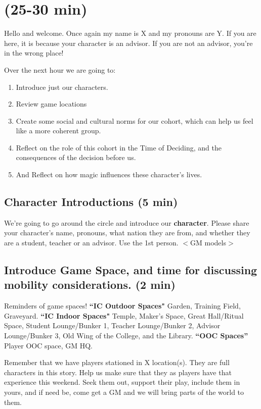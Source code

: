 \documentclass[green]{GL2020}
\begin{document}
\name{\gPreGameAdvisor{}}

\section*{(25-30 min)}

Hello and welcome. Once again my name is X and my pronouns are Y. If you are here, it is because your character is an advisor. If you are not an advisor, you're in the wrong place!

Over the next hour we are going to:
\begin{enumerate}
	\item Introduce just our characters.
	\item Review game locations
	\item Create some social and cultural norms for our cohort, which can help us feel like a more coherent group.
	\item Reflect on the role of this cohort in the Time of Deciding, and the consequences of the decision before us.
	\item And Reflect on how magic influences these character’s lives.
\end{enumerate}

\subsection*{Character Introductions (5 min)}
We’re going to go around the circle and introduce our \textbf{character}. Please share your character’s name, pronouns, what nation they are from, and whether they are a student, teacher or an advisor. Use the 1st person. $<$GM models$>$

\subsection*{Introduce Game Space, and time for discussing mobility considerations. (2 min)}
Reminders of game spaces!
\textbf{``IC Outdoor Spaces"} Garden, Training Field, Graveyard. 
\textbf{``IC Indoor Spaces"} Temple, Maker's Space, Great Hall/Ritual Space, Student Lounge/Bunker 1, Teacher Lounge/Bunker 2, Advisor Lounge/Bunker 3, Old Wing of the College, and the Library.
\textbf{``OOC Spaces''} Player OOC space, GM HQ.

Remember that we have players stationed in X location(s). They are full characters in this story. Help us make sure that they as players have that experience this weekend. Seek them out, support their play, include them in yours, and if need be, come get a GM and we will bring parts of the world to them.
\end{document}
